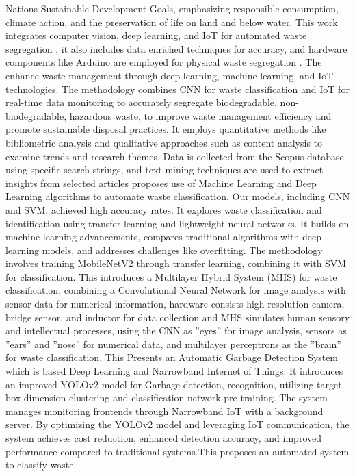 \documentclass[12pt, English]{article}
\begin{document}
\begin{normalsize}
Nations Sustainable Development Goals, emphasizing responsible consumption,
climate action, and the preservation of life on land and below water. This work integrates computer vision, deep learning, and
IoT for automated waste segregation , it also includes data
enriched techniques for accuracy, and hardware components
like Arduino are employed for physical waste segregation .
The enhance waste management through deep learning,
machine learning, and IoT technologies. The methodology
combines CNN for waste classification and IoT for real-time
data monitoring to accurately segregate biodegradable, non-biodegradable, hazardous waste, to improve waste management efficiency and promote sustainable disposal practices.
It employs quantitative methods like bibliometric analysis
and qualitative approaches such as content analysis to examine trends and research themes. Data is collected from
the Scopus database using specific search strings, and text
mining techniques are used to extract insights from selected
articles proposes use of Machine Learning and Deep
Learning algorithms to automate waste classification. Our
models, including CNN and SVM, achieved high accuracy
rates. It explores waste classification and identification
using transfer learning and lightweight neural networks. It
builds on machine learning advancements, compares traditional algorithms with deep learning models, and addresses
challenges like overfitting. The methodology involves training
MobileNetV2 through transfer learning, combining it with
SVM for classification. This introduces a Multilayer
Hybrid System (MHS) for waste classification, combining
a Convolutional Neural Network for image analysis with
sensor data for numerical information, hardware consists high resolution camera, bridge sensor, and inductor for data collection and MHS simulates human sensory and intellectual
processes, using the CNN as ”eyes” for image analysis, sensors
as ”ears” and ”nose” for numerical data, and multilayer perceptrons as the ”brain” for waste classification. This Presents
an Automatic Garbage Detection System which is based Deep
Learning and Narrowband Internet of Things. It introduces an
improved YOLOv2 model for Garbage detection, recognition,
utilizing target box dimension clustering and classification
network pre-training. The system manages monitoring frontends through Narrowband IoT with a background server. By
optimizing the YOLOv2 model and leveraging IoT communication, the system achieves cost reduction, enhanced detection
accuracy, and improved performance compared to traditional
systems.This proposes an automated system to classify waste

\end{normalsize}
\end{document}
